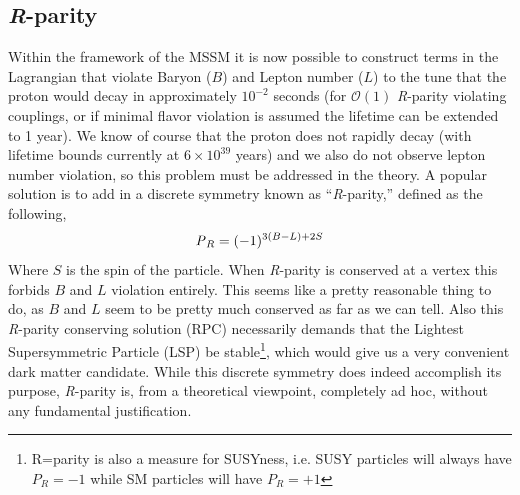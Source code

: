 \subsection{\emph{R}-parity}
Within the framework of the MSSM it is now possible to construct terms in the Lagrangian that violate Baryon ($B$) and Lepton number ($L$) to the tune that the proton would decay in approximately $10^{-2}$ seconds (for $\mathcal{O}(1)$ \emph{R}-parity violating couplings, or if minimal flavor violation is assumed the lifetime can be extended to 1 year).
We know of course that the proton does not rapidly decay (with lifetime bounds currently at $6\times10^{39}$ years) and we also do not observe lepton number violation, so this problem must be addressed in the theory.
A popular solution is to add in a discrete symmetry known as ``\emph{R}-parity,'' defined as the following,
\begin{equation}
    \text{\emph{P}}_{R}=(-1)^{3(B-L)+2S} 
\end{equation}
Where $S$ is the spin of the particle.
When \emph{R}-parity is conserved at a vertex this forbids $B$ and $L$ violation entirely.
This seems like a pretty reasonable thing to do, as $B$ and $L$ seem to be pretty much conserved as far as we can tell.
Also this \emph{R}-parity conserving solution (RPC) necessarily demands that the Lightest Supersymmetric Particle (LSP) be stable\footnote{R=parity is also a measure for SUSYness, i.e. SUSY particles will always have $P_{R}=-1$ while SM particles will have $P_{R}=+1$}, which would give us a very convenient dark matter candidate.
While this discrete symmetry does indeed accomplish its purpose, \emph{R}-parity is, from a theoretical viewpoint, completely ad hoc, without any fundamental justification.




 

